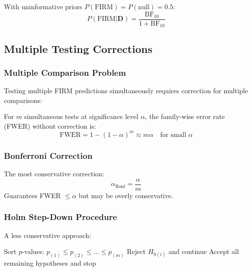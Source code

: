 With uninformative priors $P(\text{FIRM}) = P(\text{null}) = 0.5$:
\begin{equation}
P(\text{FIRM}|\mathbf{D}) = \frac{\text{BF}_{10}}{1 + \text{BF}_{10}}
\end{equation}

\subsection{Multiple Testing Corrections}

\subsubsection{Multiple Comparison Problem}

Testing multiple FIRM predictions simultaneously requires correction for multiple comparisons:

\begin{theorem}
For $m$ simultaneous tests at significance level $\alpha$, the family-wise error rate (FWER) without correction is:
\begin{equation}
\text{FWER} = 1 - (1-\alpha)^m \approx m\alpha \quad \text{for small } \alpha
\end{equation}
\end{theorem}

\subsubsection{Bonferroni Correction}

The most conservative correction:
\begin{equation}
\alpha_{\text{Bonf}} = \frac{\alpha}{m}
\end{equation}
Guarantees FWER $\leq \alpha$ but may be overly conservative.

\subsubsection{Holm Step-Down Procedure}

A less conservative approach:
\begin{algorithm}[H]
\begin{algorithmic}
\State Sort $p$-values: $p_{(1)} \leq p_{(2)} \leq \ldots \leq p_{(m)}$
        \State Reject $H_{0(i)}$ and continue
    \Else
        \State Accept all remaining hypotheses and stop
    \EndIf
\EndFor
\end{algorithmic}
\end{algorithm}

